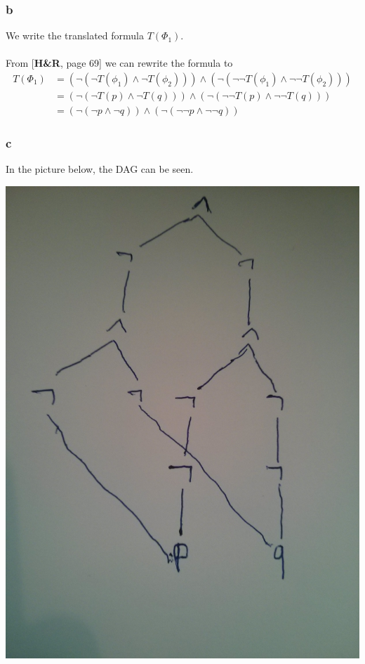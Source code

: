\documentclass[12pt]{article}
\begin{document}
\subsubsection*{b}
We write the translated formula $T(\Phi_1)$.\\
\\
From [\textbf{H\&R}, page 69] we can rewrite the formula to
\begin{align*}
T(\Phi_1)&=(\neg(\neg T(\phi_1)\land \neg T(\phi_2)))\land(\neg(\neg\neg T(\phi_1)\land \neg\neg T(\phi_2))) \\
&=(\neg(\neg T(p)\land \neg T(q)))\land(\neg(\neg\neg T(p)\land \neg\neg T(q))) \\
&=(\neg(\neg p\land \neg q))\land(\neg(\neg\neg p\land \neg\neg q))
\end{align*}

\subsubsection*{c}
In the picture below, the DAG can be seen.\\
\begin{center}
\includegraphics[scale=0.1]{1}
\end{center}
\end{document}
